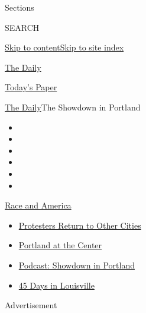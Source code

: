 Sections

SEARCH

\protect\hyperlink{site-content}{Skip to
content}\protect\hyperlink{site-index}{Skip to site index}

\href{https://www.nytimes.com/podcasts/the-daily}{The Daily}

\href{https://myaccount.nytimes.com/auth/login?response_type=cookie\&client_id=vi}{}

\href{https://www.nytimes.com/section/todayspaper}{Today's Paper}

\href{/podcasts/the-daily}{The Daily}\textbar{}The Showdown in Portland

\begin{itemize}
\item
\item
\item
\item
\item
\item
\end{itemize}

\href{https://www.nytimes.com/news-event/george-floyd-protests-minneapolis-new-york-los-angeles?action=click\&pgtype=Article\&state=default\&region=TOP_BANNER\&context=storylines_menu}{Race
and America}

\begin{itemize}
\tightlist
\item
  \href{https://www.nytimes.com/2020/07/26/us/protests-portland-seattle-trump.html?action=click\&pgtype=Article\&state=default\&region=TOP_BANNER\&context=storylines_menu}{Protesters
  Return to Other Cities}
\item
  \href{https://www.nytimes.com/2020/07/24/us/portland-oregon-protests-white-race.html?action=click\&pgtype=Article\&state=default\&region=TOP_BANNER\&context=storylines_menu}{Portland
  at the Center}
\item
  \href{https://www.nytimes.com/2020/07/23/podcasts/the-daily/portland-protests.html?action=click\&pgtype=Article\&state=default\&region=TOP_BANNER\&context=storylines_menu}{Podcast:
  Showdown in Portland}
\item
  \href{https://www.nytimes.com/interactive/2020/07/16/us/black-lives-matter-protests-louisville-breonna-taylor.html?action=click\&pgtype=Article\&state=default\&region=TOP_BANNER\&context=storylines_menu}{45
  Days in Louisville}
\end{itemize}

Advertisement

